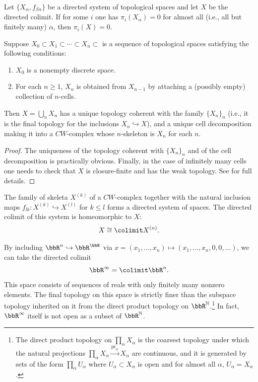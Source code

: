 \begin{prop}[{{\cite[Prop.~3.1.15]{RS2}}}]\label{prop 3.1.15 RS2}
    Let $\{X_\alpha,f_{\beta\alpha}\}$ be a directed system of topological spaces and let $X$ be the directed colimit. If for some $i$ one has $\pi_i(X_\alpha)=0$ for almost all (i.e., all but finitely many) $\alpha$, then $\pi_i(X)=0$.
\end{prop}


\begin{thm}
    Suppose $X_0\subset X_1\subset\cdots \subset X_{n}\subset $ is a sequence of topological spaces satisfying the following conditions:
    \begin{enumerate}[label=(\roman*)]
        \item $X_0$ is a nonempty discrete space.
        \item For each $n\geq 1$, $X_n$ is obtained from $X_{n-1}$ by attaching a (possibly empty) collection of $n$-cells.
    \end{enumerate}
    Then $X=\bigcup_n X_n$ has a unique topology coherent with the family $\{X_n\}_n$ (i.e., it is the final topology for the inclusions $X_n\hookrightarrow X$), and a unique cell decomposition making it into a $CW$-complex whose $n$-skeleton is $X_n$ for each $n$.
\end{thm}
\begin{proof}
    The uniqueness of the topology coherent with $\{X_n\}_n$ and of the cell decomposition is practically obvious. Finally, in the case of infinitely many cells one needs to check that $X$ is closure-finite and has the weak topology. See {{\cite[Thm.~5.20]{LeeTop}}} for full details.
\end{proof}

\begin{cor}
    The family of skeleta $X^{(k)}$ of a $CW$-complex together with the natural inclusion maps $f_{lk}:X^{(k)}\hookrightarrow X^{(l)}$ for $k\leq l$ forms a directed system of spaces. The directed colimit of this system is homeomorphic to $X$: 
    \[X\cong \colimit X^{(n)}.\]
\end{cor}


\begin{example}[$\bbR^\infty$]\index{$\bbR^\infty$}\label{R-infty}
    By including $\bbR^n\hookrightarrow \bbR^{\bbN }$ via $x=(x_1,\ldots,x_n)\mapsto (x_1,\ldots,x_n,0,0,\ldots)$, we can take the directed colimit
    \[\bbR^\infty=\colimit \bbR^n.\]
    This space consists of sequences of reals with only finitely many nonzero elements. The final topology on this space is strictly finer than the subspace topology inherited on it from the direct product topology on $\bbR^{\mathbb{N}}$.\footnote{The direct product topology on $\prod_\alpha X_\alpha$ is the coarsest topology under which the natural projections $\prod_\alpha X_\alpha\overset{\mathrm{pr}_\alpha}{\to} X_\alpha$ are continuous, and it is generated by sets of the form $\prod_\alpha U_\alpha$ where $U_\alpha\subset X_\alpha$ is open and for almost all $\alpha$, $U_\alpha=X_\alpha$.} In fact, $\bbR^\infty$ itself is not open as a subset of $\bbR^{\mathbb{N}}$.
\end{example}

